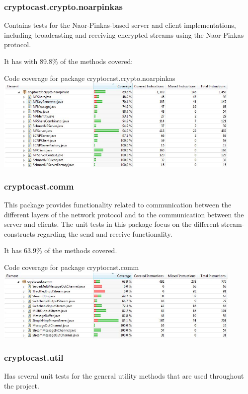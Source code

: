 \documentclass[a4paper,10pt]{scrartcl}
\begin{document}
\subsubsection{cryptocast.crypto.noarpinkas}
Contains tests for the Naor-Pinkas-based server and client implementations, including broadcasting and receiving encrypted streams using the Naor-Pinkas protocol.

It has with 89.8\% of the methods covered:
\begin{illustration}{Code coverage for package cryptocast.crypto.noarpinkas}
\includegraphics[width=450px]{figures/images/noarpinkas.jpg}
\end{illustration}
\newpage
\subsubsection{cryptocast.comm}
This package provides functionality related to communication between the different layers of the network protocol and to the communication between the server and clients. The unit tests in this package focus on the different stream-constructs regarding the send and receive functionality.

It has 63.9\% of the methods covered.

\begin{illustration}{Code coverage for package cryptocast.comm}
\includegraphics[width=450px]{figures/images/comm.jpg}
\end{illustration}
\subsubsection{cryptocast.util}
Has several unit tests for the general utility methods that are used throughout the project.
\end{document}
